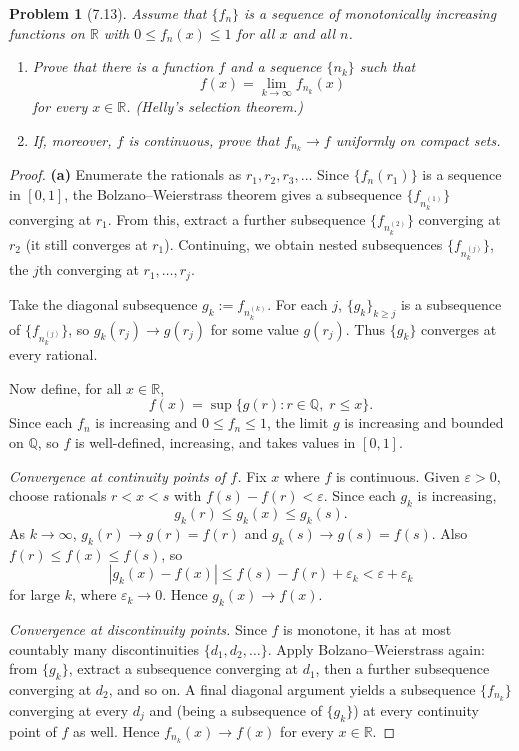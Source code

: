 \documentclass[12 pt]{article}
\newtheorem{prob}{Problem}
\begin{document}
\begin{prob}[7.13]
Assume that $\{f_{n}\}$ is a sequence of monotonically increasing functions on $\mathbb{R}$ with $0 \leq f_{n}(x) \leq 1$ for all $x$ and all $n$.

\begin{enumerate}
    \item[(a)] Prove that there is a function $f$ and a sequence $\{n_{k}\}$ such that
    $$
    f(x)=\lim _{k \rightarrow \infty} f_{n_{k}}(x)
    $$
    for every $x \in \mathbb{R}$. (Helly's selection theorem.)

    \item[(b)] If, moreover, $f$ is continuous, prove that $f_{n_{k}} \rightarrow f$ uniformly on compact sets.
\end{enumerate}
\end{prob}
\begin{proof}
\textbf{(a)} Enumerate the rationals as $r_1, r_2, r_3, \ldots$ Since $\{f_n(r_1)\}$ is a sequence in $[0,1]$, the Bolzano--Weierstrass theorem gives a subsequence $\{f_{n_k^{(1)}}\}$ converging at $r_1$. From this, extract a further subsequence $\{f_{n_k^{(2)}}\}$ converging at $r_2$ (it still converges at $r_1$). Continuing, we obtain nested subsequences $\{f_{n_k^{(j)}}\}$, the $j$th converging at $r_1, \ldots, r_j$.

Take the diagonal subsequence $g_k := f_{n_k^{(k)}}$. For each $j$, $\{g_k\}_{k \geq j}$ is a subsequence of $\{f_{n_k^{(j)}}\}$, so $g_k(r_j) \to g(r_j)$ for some value $g(r_j)$. Thus $\{g_k\}$ converges at every rational.

Now define, for all $x \in \mathbb{R}$,
$$
f(x) = \sup\{g(r) : r \in \mathbb{Q},\; r \leq x\}.
$$
Since each $f_n$ is increasing and $0 \leq f_n \leq 1$, the limit $g$ is increasing and bounded on $\mathbb{Q}$, so $f$ is well-defined, increasing, and takes values in $[0,1]$.

\emph{Convergence at continuity points of $f$.} Fix $x$ where $f$ is continuous. Given $\varepsilon > 0$, choose rationals $r < x < s$ with $f(s) - f(r) < \varepsilon$. Since each $g_k$ is increasing,
$$
g_k(r) \leq g_k(x) \leq g_k(s).
$$
As $k \to \infty$, $g_k(r) \to g(r) = f(r)$ and $g_k(s) \to g(s) = f(s)$. Also $f(r) \leq f(x) \leq f(s)$, so
$$
|g_k(x) - f(x)| \leq f(s) - f(r) + \varepsilon_k < \varepsilon + \varepsilon_k
$$
for large $k$, where $\varepsilon_k \to 0$. Hence $g_k(x) \to f(x)$.

\emph{Convergence at discontinuity points.} Since $f$ is monotone, it has at most countably many discontinuities $\{d_1, d_2, \ldots\}$. Apply Bolzano--Weierstrass again: from $\{g_k\}$, extract a subsequence converging at $d_1$, then a further subsequence converging at $d_2$, and so on. A final diagonal argument yields a subsequence $\{f_{n_k}\}$ converging at every $d_j$ and (being a subsequence of $\{g_k\}$) at every continuity point of $f$ as well. Hence $f_{n_k}(x) \to f(x)$ for every $x \in \mathbb{R}$.


\end{proof}
\end{document}
